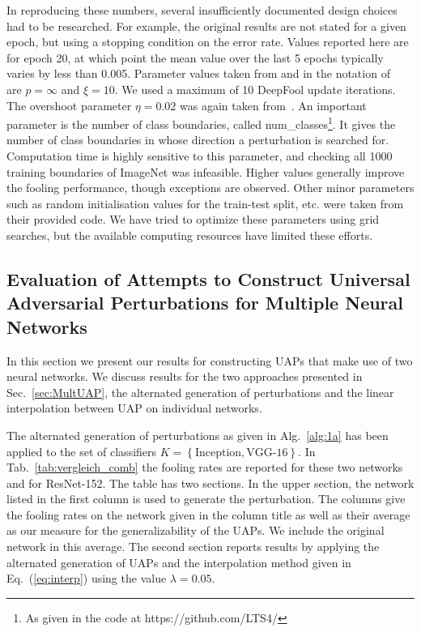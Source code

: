\documentclass[runningheads]{llncs}
\begin{document}
In reproducing these numbers, several insufficiently documented design choices had to be researched. For example, the original results are not stated for a given epoch, but using a stopping condition on the error rate. Values reported here are for epoch 20, at which point the mean value over the last 5 epochs typically varies by less than 0.005. Parameter values taken from and in the notation of~\cite{DeepFool-Moosavi-Dezfooli15} are \(p=\infty\) and \(\xi=10\). We used a maximum of 10 DeepFool update iterations. The overshoot parameter \(\eta=0.02\) was again taken from~\cite{DeepFool-Moosavi-Dezfooli15}. 
An important parameter is the number of class boundaries, called num\_classes\footnote{As given in the code at https://github.com/LTS4/}. It gives the number of class boundaries in whose direction a perturbation is searched for. Computation time is highly sensitive to this parameter, and checking all 1000 training boundaries of ImageNet was infeasible. Higher values generally improve the fooling performance, though exceptions are observed. 
Other minor parameters such as random initialisation values for the train-test split, etc. were taken from their provided code. We have tried to optimize these parameters using grid searches, but the available computing resources have limited these efforts. 

\subsection{Evaluation of Attempts to Construct Universal Adversarial Perturbations for Multiple Neural Networks}
In this section we present our results for constructing UAPs that make use of two neural networks. We discuss results for the two approaches presented in Sec.~\ref{sec:MultUAP}, the alternated generation of perturbations and the linear interpolation between UAP on individual networks.

The alternated generation of perturbations as given in Alg.~\ref{alg:1a} has been applied to the set of classifiers \(K=\left\{\text{Inception},\text{VGG-16}\right\}\). In Tab.~\ref{tab:vergleich_comb} the fooling rates are reported for these two networks and for ResNet-152. The table has two sections. In the upper section, the network listed in the first column is used to generate the perturbation. The columns give the fooling rates on the network given in the column title as well as their average as our measure for the generalizability of the UAPs. We include the original network in this average. 
The second section reports results by applying the alternated generation of UAPs and the interpolation method given in Eq.~(\ref{eq:interp}) using the value $\lambda=0.05$. 
\end{document}
